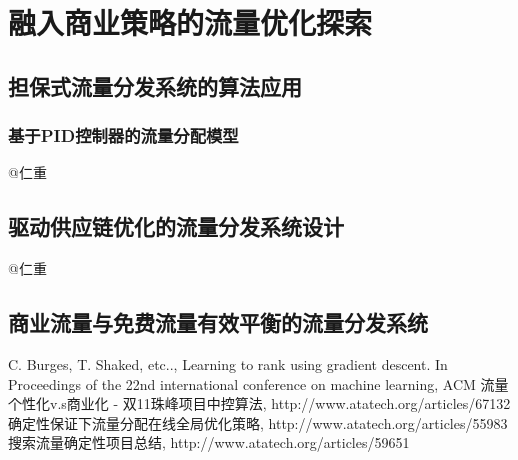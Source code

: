 
\chapter{ 融入商业策略的流量优化探索 }
\thispagestyle{empty}

\setlength{\fboxrule}{0pt}\setlength{\fboxsep}{0cm}
\noindent\shadowbox{
\begin{tcolorbox}[arc=0mm,colback=lightblue,colframe=darkblue,title=学习目标与要求]

\end{tcolorbox}}
\setlength{\fboxrule}{1pt}\setlength{\fboxsep}{4pt} 





\section{担保式流量分发系统的算法应用}
\subsection {基于PID控制器的流量分配模型}
@仁重 

\section{驱动供应链优化的流量分发系统设计} 
@仁重

\section{商业流量与免费流量有效平衡的流量分发系统} 


\begin{thebibliography}{99}
 C. Burges, T. Shaked, etc.., Learning to rank 
using gradient descent. In Proceedings of the 22nd international 
conference on machine learning, ACM
 流量个性化v.s商业化 - 双11珠峰项目中控算法, http://www.atatech.org/articles/67132
 确定性保证下流量分配在线全局优化策略, http://www.atatech.org/articles/55983
 搜索流量确定性项目总结, http://www.atatech.org/articles/59651
\end{thebibliography}

 
